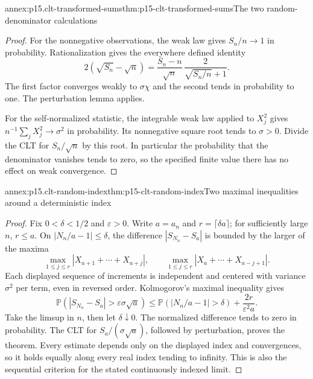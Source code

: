 \begin{annexitem}{annex:p15.clt-transformed-sums}{thm:p15-clt-transformed-sums}{The two random-denominator calculations}
\begin{proof}
For the nonnegative observations, the weak law gives \(S_n/n\to1\)
in probability. Rationalization gives the everywhere defined identity
\[
 2(\sqrt{S_n}-\sqrt n)
 =\frac{S_n-n}{\sqrt n}\,
                      \frac{2}{\sqrt{S_n/n}+1}.
 \]
The first factor converges weakly to \(\sigma\chi\) and the
second tends in probability to one. The perturbation lemma applies.

For the self-normalized statistic, the integrable weak law applied
to \(X_j^2\) gives \(n^{-1}\sum_jX_j^2\to\sigma^2\) in
probability. Its nonnegative square root tends to \(\sigma>0\).
Divide the CLT for \(S_n/\sqrt n\) by this root. In particular
the probability that the denominator vanishes tends to zero,
so the specified finite value there has no effect on weak convergence.
\end{proof}
\end{annexitem}

\begin{annexitem}{annex:p15.clt-random-index}{thm:p15-clt-random-index}{Two maximal inequalities around a deterministic index}
\begin{proof}
Fix \(0<\delta<1/2\) and \(\varepsilon>0\). Write \(a=a_n\)
and \(r=\lceil\delta a\rceil\); for sufficiently large \(n\),
\(r\leq a\). On \(|N_n/a-1|\leq\delta\), the difference
\(|S_{N_n}-S_a|\) is bounded by the larger of the maxima
\[
 \max_{1\leq j\leq r}|X_{a+1}+\cdots+X_{a+j}|,\qquad
 \max_{1\leq j\leq r}|X_a+\cdots+X_{a-j+1}|.
 \]
Each displayed sequence of increments is independent and centered
with variance \(\sigma^2\) per term, even in reversed order.
Kolmogorov's maximal inequality gives
\[
 \mathbb P(|S_{N_n}-S_a|>\varepsilon\sigma\sqrt a)
 \leq\mathbb P(|N_n/a-1|>\delta)
                                  +\frac{2r}{\varepsilon^2a}.
 \]
Take the limsup in \(n\), then let \(\delta\downarrow0\).
The normalized difference tends to zero in probability.
The CLT for \(S_a/(\sigma\sqrt a)\), followed by perturbation,
proves the theorem. Every estimate depends only on the displayed
index and convergences, so it holds equally along every real
index tending to infinity. This is also the sequential criterion
for the stated continuously indexed limit.
\end{proof}
\end{annexitem}

